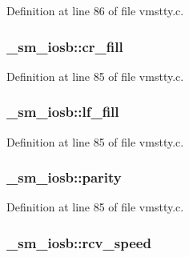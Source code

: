 Definition at line 86 of file vmstty.\+c.

\hypertarget{struct__sm__iosb_a0fa025e105b0cec813e09427e0169f58}{
\subsubsection[{cr\+\_\+fill}]{ \+\_\+sm\+\_\+iosb\+::cr\+\_\+fill}}\label{struct__sm__iosb_a0fa025e105b0cec813e09427e0169f58}


Definition at line 85 of file vmstty.\+c.

\hypertarget{struct__sm__iosb_ade9bfa02916307456ef5df26632f4019}{
\subsubsection[{lf\+\_\+fill}]{ \+\_\+sm\+\_\+iosb\+::lf\+\_\+fill}}\label{struct__sm__iosb_ade9bfa02916307456ef5df26632f4019}


Definition at line 85 of file vmstty.\+c.

\hypertarget{struct__sm__iosb_a5aec1f01cbeb31fb9d9599e95a2cc8e7}{
\subsubsection[{parity}]{ \+\_\+sm\+\_\+iosb\+::parity}}\label{struct__sm__iosb_a5aec1f01cbeb31fb9d9599e95a2cc8e7}


Definition at line 85 of file vmstty.\+c.

\hypertarget{struct__sm__iosb_a42baad496f74694a9e4045e5099ab0b2}{
\subsubsection[{rcv\+\_\+speed}]{ \+\_\+sm\+\_\+iosb\+::rcv\+\_\+speed}}\label{struct__sm__iosb_a42baad496f74694a9e4045e5099ab0b2}


